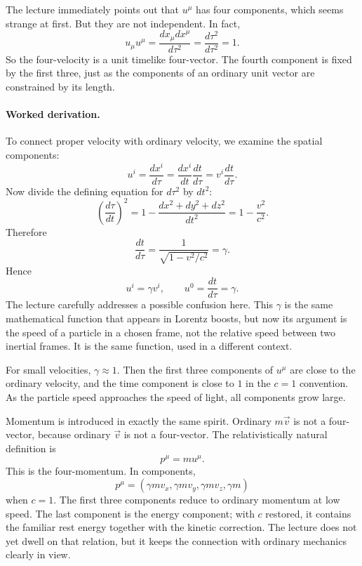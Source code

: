 The lecture immediately points out that \(u^\mu\) has four components, which seems strange at first. But they are not independent. In fact,
\begin{equation}
u_\mu u^\mu
=
\frac{dx_\mu dx^\mu}{d\tau^2}
=
\frac{d\tau^2}{d\tau^2}
=
1.
\end{equation}
So the four-velocity is a unit timelike four-vector. The fourth component is fixed by the first three, just as the components of an ordinary unit vector are constrained by its length.

\paragraph{Worked derivation.}
To connect proper velocity with ordinary velocity, we examine the spatial components:
\begin{equation}
u^i=\frac{dx^i}{d\tau}
=
\frac{dx^i}{dt}\frac{dt}{d\tau}
=
v^i\frac{dt}{d\tau}.
\end{equation}
Now divide the defining equation for \(d\tau^2\) by \(dt^2\):
\begin{equation}
\left(\frac{d\tau}{dt}\right)^2
=
1-\frac{dx^2+dy^2+dz^2}{dt^2}
=
1-\frac{v^2}{c^2}.
\end{equation}
Therefore
\begin{equation}
\frac{dt}{d\tau}
=
\frac{1}{\sqrt{1-v^2/c^2}}
=
\gamma.
\end{equation}
Hence
\begin{equation}
u^i=\gamma v^i,
\qquad
u^0=\frac{dt}{d\tau}=\gamma.
\end{equation}
The lecture carefully addresses a possible confusion here. This \(\gamma\) is the same mathematical function that appears in Lorentz boosts, but now its argument is the speed of a particle in a chosen frame, not the relative speed between two inertial frames. It is the same function, used in a different context.

For small velocities, \(\gamma\approx 1\). Then the first three components of \(u^\mu\) are close to the ordinary velocity, and the time component is close to \(1\) in the \(c=1\) convention. As the particle speed approaches the speed of light, all components grow large.

Momentum is introduced in exactly the same spirit. Ordinary \(m\vec v\) is not a four-vector, because ordinary \(\vec v\) is not a four-vector. The relativistically natural definition is
\begin{equation}
p^\mu=mu^\mu.
\end{equation}
This is the four-momentum. In components,
\[
p^\mu=(\gamma mv_x,\gamma mv_y,\gamma mv_z,\gamma m)
\]
when \(c=1\). The first three components reduce to ordinary momentum at low speed. The last component is the energy component; with \(c\) restored, it contains the familiar rest energy together with the kinetic correction. The lecture does not yet dwell on that relation, but it keeps the connection with ordinary mechanics clearly in view.

